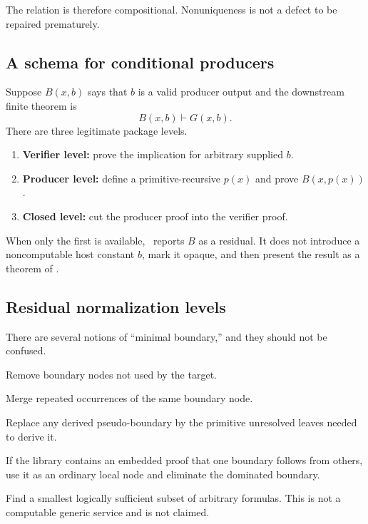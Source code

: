 The relation is therefore compositional.  Nonuniqueness is not a defect to be repaired prematurely.

\subsection{A schema for conditional producers}

Suppose \(B(x,b)\) says that \(b\) is a valid producer output and the downstream finite theorem is
\[
 B(x,b)\vdash G(x,b).
\]
There are three legitimate package levels.

\begin{enumerate}
\item \textbf{Verifier level:} prove the implication for arbitrary supplied \(b\).
\item \textbf{Producer level:} define a primitive-recursive \(p(x)\) and prove \(B(x,p(x))\).
\item \textbf{Closed level:} cut the producer proof into the verifier proof.
\end{enumerate}

When only the first is available, \CIFER\ reports \(B\) as a residual.  It does not introduce a noncomputable host constant \(b\), mark it opaque, and then present the result as a theorem of \iPRA.

\subsection{Residual normalization levels}

There are several notions of ``minimal boundary,'' and they should not be confused.

\begin{description}[style=nextline]
\item[Reachability normalization.] Remove boundary nodes not used by the target.
\item[Duplicate normalization.] Merge repeated occurrences of the same boundary node.
\item[Dependency expansion.] Replace any derived pseudo-boundary by the primitive unresolved leaves needed to derive it.
\item[Declared dominance.] If the library contains an embedded proof that one boundary follows from others, use it as an ordinary local node and eliminate the dominated boundary.
\item[Logical minimization.] Find a smallest logically sufficient subset of arbitrary formulas.  This is not a computable generic service and is not claimed.
\end{description}

